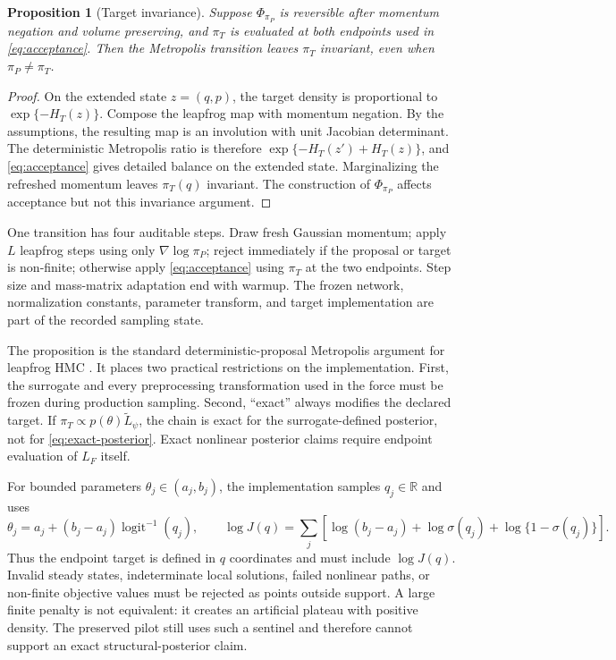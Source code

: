 \documentclass[11pt]{article}
\newtheorem{proposition}{Proposition}
\begin{document}
\begin{proposition}[Target invariance]
Suppose $\Phi_{\pi_P}$ is reversible after momentum negation and volume
preserving, and $\pi_T$ is evaluated at both endpoints used in
\eqref{eq:acceptance}. Then the Metropolis transition leaves $\pi_T$ invariant,
even when $\pi_P\neq\pi_T$.
\end{proposition}

\begin{proof}
On the extended state $z=(q,p)$, the target density is proportional to
$\exp\{-H_T(z)\}$. Compose the leapfrog map with momentum negation. By the
assumptions, the resulting map is an involution with unit Jacobian determinant.
The deterministic Metropolis ratio is therefore
$\exp\{-H_T(z')+H_T(z)\}$, and \eqref{eq:acceptance} gives detailed balance on
the extended state. Marginalizing the refreshed momentum leaves $\pi_T(q)$
invariant. The construction of $\Phi_{\pi_P}$ affects acceptance but not this
invariance argument.
\end{proof}

One transition has four auditable steps. Draw fresh Gaussian momentum; apply
$L$ leapfrog steps using only $\nabla\log\pi_P$; reject immediately if the
proposal or target is non-finite; otherwise apply \eqref{eq:acceptance} using
$\pi_T$ at the two endpoints. Step size and mass-matrix adaptation end with
warmup. The frozen network, normalization constants, parameter transform, and
target implementation are part of the recorded sampling state.

The proposition is the standard deterministic-proposal Metropolis argument for
leapfrog HMC \citep{neal2011hmc}. It places two practical
restrictions on the implementation. First, the surrogate and every preprocessing
transformation used in the force must be frozen during production sampling.
Second, ``exact'' always modifies the declared target. If
$\pi_T\propto p(\theta)\widetilde L_{\psi}$, the chain is exact for the
surrogate-defined posterior, not for \eqref{eq:exact-posterior}. Exact nonlinear
posterior claims require endpoint evaluation of $L_F$ itself.

For bounded parameters $\theta_j\in(a_j,b_j)$, the implementation samples
$q_j\in\mathbb{R}$ and uses
\begin{equation}
  \theta_j=a_j+(b_j-a_j)\operatorname{logit}^{-1}(q_j),
  \qquad
  \log J(q)=\sum_j\left[
    \log(b_j-a_j)+\log\sigma(q_j)+\log\{1-\sigma(q_j)\}
  \right].
  \label{eq:bounded-transform}
\end{equation}
Thus the endpoint target is defined in $q$ coordinates and must include
$\log J(q)$. Invalid steady states, indeterminate local solutions, failed
nonlinear paths, or non-finite objective values must be rejected as points
outside support. A large finite penalty is not equivalent: it creates an
artificial plateau with positive density. The preserved pilot still uses such a
sentinel and therefore cannot support an exact structural-posterior claim.
\end{document}
